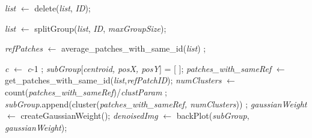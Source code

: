 \documentclass[fleqn,10pt]{wlscirep}
\begin{document}
\begin{algorithm}
\begin{algorithmic}[1]
				\State \textit{list} $\gets$ delete(\textit{list}, \textit{ID});
				
				
				\State \textit{list} $\gets$ splitGroup(\textit{list}, \textit{ID}, \textit{maxGroupSize});
				
				
				\EndIf
				
				\EndFor
				
				\State \textit{refPatches} $\gets$ average\_patches\_with\_same\_id(\textit{list}) ;
				
				\State \textit{c} $\gets$ \textit{c}-1 ;
				\EndFor
				\State \textit{subGroup}[\textit{centroid, posX, posY}] = [ ];
				\State \textit{patches\_with\_sameRef} $\gets$ get\_patches\_with\_same\_id(\textit{list},\textit{refPatchID});
				\State \textit{numClusters} $\gets$ count(\textit{patches\_with\_sameRef})/\textit{clustParam} ;
				\State \textit{subGroup}.append(cluster(\textit{patches\_with\_sameRef, numClusters})) ;
				\EndFor
				\State \textit{gaussianWeight} $\gets$ createGaussianWeight();
				\State \textit{denoisedImg} $\gets$ backPlot(\textit{subGroup}, \textit{gaussianWeight});
			\end{algorithmic}
		\end{algorithm}
		
		\clearpage
		
		
	
\end{document}
